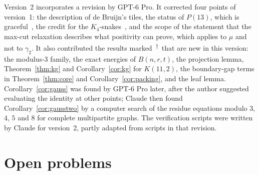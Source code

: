 \documentclass[11pt]{amsart}
\theoremstyle{tplain}
\theoremstyle{tdefinition}
\theoremstyle{tremark}
\newcommand{\gpt}{\textsuperscript{$\dagger$}}
\begin{document}
Version~2 incorporates a revision by GPT-6 Pro. It corrected four points of
version~1: the description of de Bruijn's tiles, the status of $P(13)$, which
is graceful~\cite{paley13}, the credit for the $K_4$-snakes~\cite{dorehall},
and the scope of the statement that the max-cut relaxation describes what
positivity can prove, which applies to $\mu$ and not to $\gamma_2$. It also
contributed the results marked~\gpt\ that are new in this version: the
modulus-$3$ family, the exact energies of $B(n,r,t)$, the projection lemma,
Theorem~\ref{thm:kg} and Corollary~\ref{cor:kg} for $K(11,2)$, the
boundary-gap terms in Theorem~\ref{thm:core} and
Corollary~\ref{cor:packing}, and the leaf lemma. Corollary~\ref{cor:gauss}
was found by GPT-6 Pro later, after the author suggested evaluating the
identity at other points; Claude then found Corollary~\ref{cor:gausstwo} by a
computer search of the residue equations modulo $3$, $4$, $5$ and $8$ for
complete multipartite graphs. The verification scripts
were written by Claude for version~2, partly adapted from scripts in that
revision.

\section{Open problems}\label{sec:open}
\end{document}
